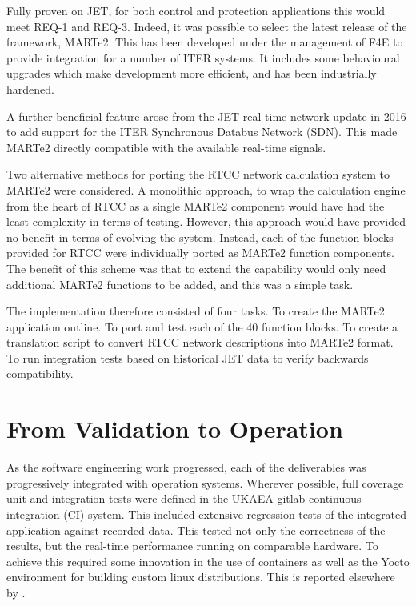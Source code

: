 \documentclass[5p]{elsarticle}
\begin{document}
Fully proven on JET, for both control and protection applications
this would meet REQ-1 and REQ-3. Indeed, it was possible to select 
the latest release of the framework, MARTe2.  This has been 
developed under the management of F4E to provide integration for
a number of ITER systems. It includes some behavioural upgrades
which make development more efficient, and has been industrially
hardened.  

A further beneficial feature arose from the JET real-time
network update in 2016 to add support for the ITER 
Synchronous Databus Network (SDN). This made MARTe2
directly compatible with the available real-time signals.

Two alternative methods for porting the RTCC network calculation system 
to MARTe2 were considered. A monolithic approach, to wrap the calculation
engine from the heart of RTCC as a single MARTe2 component would have
had the least complexity in terms of testing.  However, this approach
would have provided no benefit in terms of evolving the system. 
Instead, each of the function blocks provided for RTCC were
individually ported as MARTe2 function components.  The benefit
of this scheme was that to extend the capability would only
need additional MARTe2 functions to be added, and this was a simple task.

The implementation therefore consisted of four tasks.  To create the 
MARTe2 application outline.  To port and test each of the 40 function
blocks.  To create a translation script to convert RTCC network
descriptions into MARTe2 format. To run integration tests based on
historical JET data to verify backwards compatibility.

\section{From Validation to Operation}

As the software engineering work progressed, each of the deliverables
was progressively integrated with operation systems.  Wherever
possible, full coverage unit and integration tests were defined
in the UKAEA gitlab continuous integration (CI) system.
This included extensive regression tests of the integrated 
application against recorded data.  This tested not only
the correctness of the results, but the real-time performance
running on comparable hardware.  To achieve this required
some innovation in the use of containers as well as the
Yocto environment for building custom linux distributions.
This is reported elsewhere by \cite{EdJones}.
\end{document}
